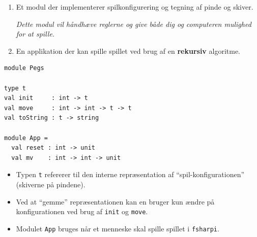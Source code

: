 \documentclass[rgb]{beamer}
\begin{document}
\begin{frame}[fragile]
\begin{footnotesize}

  \vspace{1ex}

  \begin{enumerate}
  \item Et modul der implementerer spilkonfigurering og tegning af pinde og skiver.

    \emph{Dette modul vil håndhæve reglerne og give både dig og computeren mulighed for at spille.}

    \vspace{1ex}
  \item En applikation der kan spille spillet ved brug af en \textbf{rekursiv} algoritme.
  \end{enumerate}

\end{footnotesize}
\end{frame}

\begin{frame}[fragile]
\begin{footnotesize}

  \vspace{1ex}

\begin{lstlisting}[numbers=none,frame=none,mathescape]
module Pegs

type t
val init     : int -> t
val move     : int -> int -> t -> t
val toString : t -> string

module App =
  val reset : int -> unit
  val mv    : int -> int -> unit
\end{lstlisting}

\vspace{1ex}
\begin{itemize}
\item Typen \lstinline{t} refererer til den interne repræsentation af ``spil-konfigurationen'' (skiverne på pindene).
\item Ved at ``gemme'' repræsentationen kan en bruger kun ændre på
  konfigurationen ved brug af \lstinline{init} og \lstinline{move}.
\item Modulet \lstinline{App} bruges når et menneske skal spille spillet i \verb+fsharpi+.
\end{itemize}

\end{footnotesize}
\end{frame}
\end{document}
